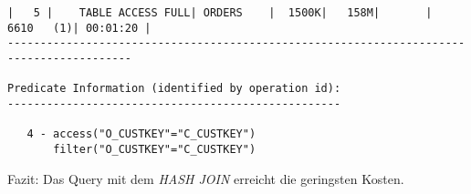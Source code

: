\documentclass[11pt,a4paper,parskip=half]{scrartcl}
\begin{document}
\begin{lstlisting}
|   5 |    TABLE ACCESS FULL| ORDERS    |  1500K|   158M|       |  6610   (1)| 00:01:20 |                                                                                                                                                                                                                    
-----------------------------------------------------------------------------------------                                                                                                                                                                                                                    
                                                                                                                                                                                                                                                                                                             
Predicate Information (identified by operation id):                                                                                                                                                                                                                                                          
---------------------------------------------------                                                                                                                                                                                                                                                          
                                                                                                                                                                                                                                                                                                             
   4 - access("O_CUSTKEY"="C_CUSTKEY")                                                                                                                                                                                                                                                                       
       filter("O_CUSTKEY"="C_CUSTKEY")                                                                                                                                                                                                                                                                       
\end{lstlisting}

Fazit: Das Query mit dem \emph{HASH JOIN} erreicht die geringsten Kosten.
\end{document}
